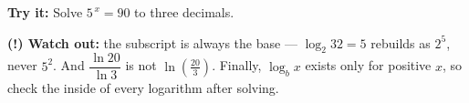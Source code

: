 \documentclass[12pt]{article}
\begin{document}
\begin{tryitbox}
\textbf{Try it:} Solve $5^{\,x} = 90$ to three decimals.\\[2pt]
\end{tryitbox}

\begin{watchoutbox}
\textbf{(!) Watch out:} the subscript is always the base --- $\log_2 32 = 5$
rebuilds as $2^5$, never $5^2$. And $\dfrac{\ln 20}{\ln 3}$ is not
$\ln\!\left(\frac{20}{3}\right)$. Finally, $\log_b x$ exists only for positive
$x$, so check the inside of every logarithm after solving.
\end{watchoutbox}
\end{document}
